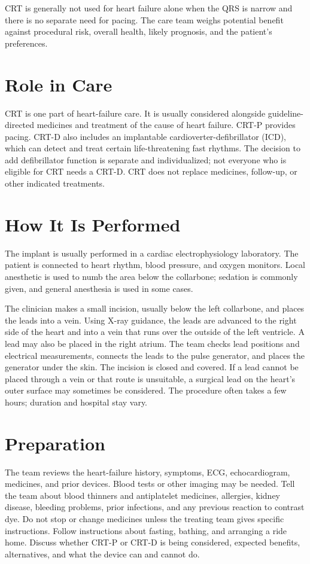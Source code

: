 CRT is generally not used for heart failure alone when the QRS is narrow and there is no separate need for pacing. The care team weighs potential benefit against procedural risk, overall health, likely prognosis, and the patient's preferences.

\section*{Role in Care}
CRT is one part of heart-failure care. It is usually considered alongside guideline-directed medicines and treatment of the cause of heart failure. CRT-P provides pacing. CRT-D also includes an implantable cardioverter-defibrillator (ICD), which can detect and treat certain life-threatening fast rhythms. The decision to add defibrillator function is separate and individualized; not everyone who is eligible for CRT needs a CRT-D. CRT does not replace medicines, follow-up, or other indicated treatments.

\section*{How It Is Performed}
The implant is usually performed in a cardiac electrophysiology laboratory. The patient is connected to heart rhythm, blood pressure, and oxygen monitors. Local anesthetic is used to numb the area below the collarbone; sedation is commonly given, and general anesthesia is used in some cases.

The clinician makes a small incision, usually below the left collarbone, and places the leads into a vein. Using X-ray guidance, the leads are advanced to the right side of the heart and into a vein that runs over the outside of the left ventricle. A lead may also be placed in the right atrium. The team checks lead positions and electrical measurements, connects the leads to the pulse generator, and places the generator under the skin. The incision is closed and covered. If a lead cannot be placed through a vein or that route is unsuitable, a surgical lead on the heart's outer surface may sometimes be considered. The procedure often takes a few hours; duration and hospital stay vary.

\section*{Preparation}
The team reviews the heart-failure history, symptoms, ECG, echocardiogram, medicines, and prior devices. Blood tests or other imaging may be needed. Tell the team about blood thinners and antiplatelet medicines, allergies, kidney disease, bleeding problems, prior infections, and any previous reaction to contrast dye. Do not stop or change medicines unless the treating team gives specific instructions. Follow instructions about fasting, bathing, and arranging a ride home. Discuss whether CRT-P or CRT-D is being considered, expected benefits, alternatives, and what the device can and cannot do.

